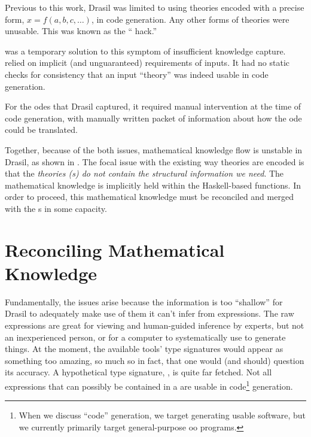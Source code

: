 Previous to this work, Drasil was limited to using theories encoded with a
precise form, \(x = f(a, b, c, \ldots{})\), in code generation. Any other forms
of theories were unusable. This was known as the ``\relToQD{} hack.''

\originalRelToQDHaskell{}

 was a temporary solution to this symptom of
insufficient knowledge capture. \relToQD{} relied on implicit (and unguaranteed)
requirements of inputs. It had no static checks for consistency that an input
``theory'' was indeed usable in code generation.

For the \acsp{ode} that Drasil captured, it required manual intervention at the
time of code generation, with manually written packet of information about how
the \acs{ode} could be translated.

Together, because of the both issues, mathematical knowledge flow is unstable in
Drasil, as shown in . The focal issue with the
existing way theories are encoded is that the \textit{theories
	(\RelationConcept{}s) do not contain the structural information we need}. The
mathematical knowledge is implicitly held within the Haskell-based functions. In
order to proceed, this mathematical knowledge must be reconciled and merged with
the \RelationConcept{}s in some capacity.

\theoriesWithoutModelKinds{}

\section{Reconciling Mathematical Knowledge}

Fundamentally, the issues arise because the information is too ``shallow'' for
Drasil to adequately make use of them \textemdash{} it can't infer from
expressions. The raw expressions are great for viewing and human-guided
inference by experts, but not an inexperienced person, or for a computer to
systematically use to generate things. At the moment, the available tools' type
signatures would appear as something too amazing, so much so in fact, that one
would (and should) question its accuracy. A hypothetical type signature,
, is quite far fetched. Not all expressions
that can possibly be contained in a \RelationConcept{} are usable in
code\footnote{When we discuss ``code'' generation, we target generating usable
	software, but we currently primarily target general-purpose \acs{oo} programs.}
generation.

